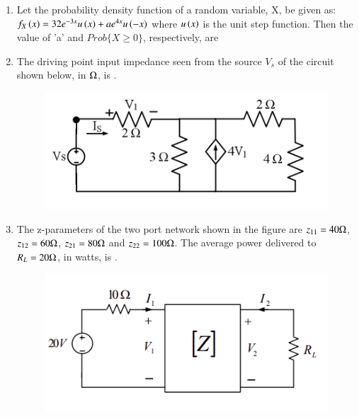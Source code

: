 \documentclass[journal,12pt,onecolumn]{IEEEtran}
\theoremstyle{remark}
\begin{document}
\begin{enumerate}[start=1, label=Q.\arabic*]
    \hfill{}

    \item Let the probability density function of a random variable, X, be given as: $f_X\left(x\right) = 32e^{-3x}u\left(x\right) + ae^{4x}u\left(-x\right)$ where $u\left(x\right)$ is the unit step function. Then the value of 'a' and $Prob\{X \geq 0\}$, respectively, are
    \begin{enumerate}
    \end{enumerate}

    \hfill{}

    \item The driving point input impedance seen from the source $V_s$ of the circuit shown below, in $\ohm$, is \underline{\hspace{2cm}}.
    \begin{figure}[H]
        \includegraphics[width=0.4\columnwidth]{Figures/2q34.png}
        \centering
        \caption{}
    \end{figure}

    \hfill{}

    \item The z-parameters of the two port network shown in the figure are $z_{11} = 40\ohm$, $z_{12} = 60\ohm$, $z_{21} = 80\ohm$ and $z_{22} = 100\ohm$. The average power delivered to $R_L=20\ohm$, in watts, is \underline{\hspace{2cm}}.
    \begin{figure}[H]
        \includegraphics[width=0.6\columnwidth]{Figures/2q36.png}
        \centering
        \caption{}
    \end{figure}


\end{enumerate}
\end{document}
